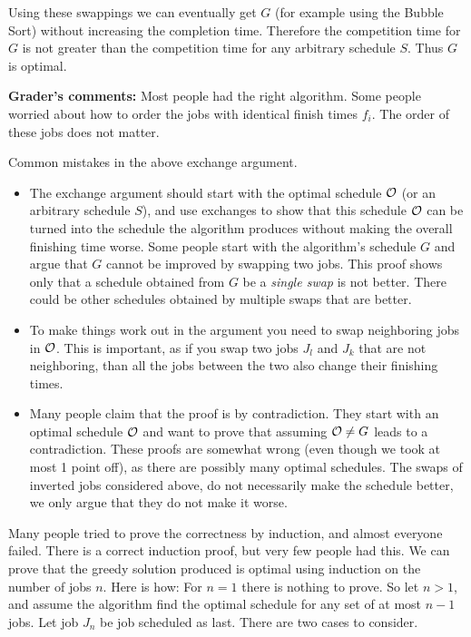 \documentclass[12pt]{article}
\begin{document}
\begin{enumerate}
{Using these swappings we can eventually get $G$ (for example using the Bubble Sort)
without increasing the completion time.
Therefore the competition time for $G$ is not greater than
the competition time for any arbitrary schedule $S$.
Thus $G$ is optimal.

\bigskip

{\bf Grader's comments:}
Most people had the right algorithm. Some people worried about how to
order the jobs with identical finish times $f_i$. The order of these
jobs does not matter.

Common mistakes in the above exchange argument.
\begin{itemize}
\item
The exchange argument should start with the optimal schedule ${\cal O}$ (or
an arbitrary schedule $S$), and
use exchanges to show that this schedule ${\cal O}$ can be turned into the
schedule the algorithm produces without making the overall finishing time
worse. Some people start with the algorithm's schedule $G$ and argue that
$G$ cannot be improved by swapping two jobs. This proof shows only that
a schedule obtained from $G$ be a {\em single swap} is not better. There
could be
other schedules obtained by multiple swaps that are better.
\item To make things work out in the argument you need to swap
neighboring jobs in  ${\cal O}$. This is important, as if you swap two jobs
$J_l$ and $J_k$ that are not neighboring, than all the jobs between the two
also change their finishing times.
\item Many people claim that the proof is by contradiction. They start with
an optimal schedule ${\cal O}$ and want to prove that assuming
${\cal O} \neq G$ leads to a contradiction. These proofs are somewhat wrong
(even though we took at most 1 point off), as there are possibly many optimal
schedules. The swaps of inverted jobs considered above, do not necessarily
make the schedule better, we only argue that they do not make it worse.
\end{itemize}

\medskip

Many people tried to prove the correctness by induction, and almost everyone
failed. There is a correct induction proof, but very few people had this.
We can prove that the greedy solution produced is optimal using induction on the
number of jobs $n$. Here is how:
For $n=1$ there is nothing to prove. So let 
$n>1$, and assume the algorithm     
find the optimal schedule for any set of at most $n-1$ jobs.
Let job $J_n$ be job scheduled as last. There are two cases to consider.

}
\end{enumerate}
\end{document}
